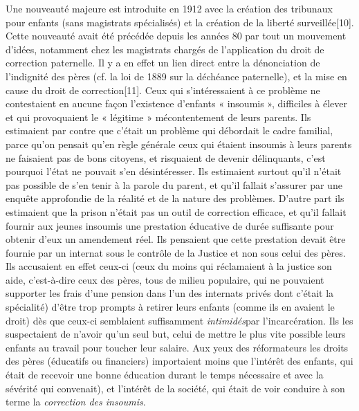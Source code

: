  Une nouveauté majeure est introduite en 1912 avec la création des tribunaux pour enfants (sans magistrats spécialisés) et la création de la liberté surveillée[10]. Cette nouveauté avait été précédée depuis les années 80 par tout un mouvement d'idées, notamment chez les magistrats chargés de l'application du droit de correction paternelle. Il y a en effet un lien direct entre la dénonciation de l'indignité des pères (cf. la loi de 1889 sur la déchéance paternelle), et la mise en cause du droit de correction[11]. Ceux qui s'intéressaient à ce problème ne contestaient en aucune façon l'existence d'enfants « insoumis », difficiles à élever et qui provoquaient le « légitime » mécontentement de leurs parents. Ils estimaient par contre que c'était un problème qui débordait le cadre familial, parce qu'on pensait qu'en règle générale ceux qui étaient insoumis à leurs parents ne faisaient pas de bons citoyens, et risquaient de devenir délinquants, c'est pourquoi l'état ne pouvait s'en désintéresser. Ils estimaient surtout qu'il n'était pas possible de s'en tenir à la parole du parent, et qu'il fallait s'assurer par une enquête approfondie de la réalité et de la nature des problèmes. 
 D'autre part ils estimaient que la prison n'était pas un outil de correction efficace, et qu'il fallait fournir aux jeunes insoumis une prestation éducative de durée suffisante pour obtenir d'eux un amendement réel. Ils pensaient que cette prestation devait être fournie par un internat sous le contrôle de la Justice et non sous celui des pères. Ils accusaient en effet ceux-ci (ceux du moins qui réclamaient à la justice son aide, c'est-à-dire ceux des pères, tous de milieu populaire, qui ne pouvaient supporter les frais d'une pension dans l'un des internats privés dont c'était la spécialité) d'être trop prompts à retirer leurs enfants (comme ils en avaient le droit) dès que ceux-ci semblaient suffisamment\emph{ intimidés}par l'incarcération. Ils les suspectaient de n'avoir qu'un seul but, celui de mettre le plus vite possible leurs enfants au travail pour toucher leur salaire. Aux yeux des réformateurs les droits des pères (éducatifs ou financiers) importaient moins que l'intérêt des enfants, qui était de recevoir une bonne éducation durant le temps nécessaire et avec la sévérité qui convenait), et l'intérêt de la société, qui était de voir conduire à son terme la \emph{correction des insoumis}. 
